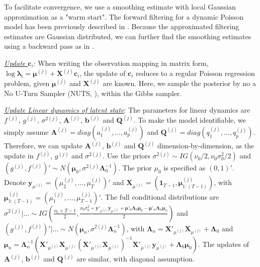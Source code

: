 \documentclass{article}
\begin{document}
	To facilitate convergence, we use a smoothing estimate with local Gaussian approximation as a "warm start". The forward filtering for a dynamic Poisson model has been previously described in \cite{Eden2004}. Because the approximated filtering estimates are Gaussian distributed, we can further find the smoothing estimates using a backward pass as in \cite{RAUCH1965}.
	
	\underline{\textit{Update $\bm{c}_i$}}: 
	When writing the observation mapping in matrix form,
	$\log\bm{\lambda}_i = \bm{\mu}^{(j)}+ \bm{X}^{(j)}\bm{c}_i$, the update of $\bm{c}_i$ reduces to a regular Poisson regression problem, given $\bm{\mu}^{(j)}$ and $\bm{X}^{(j)}$ are known. Here, we sample the posterior by no a No U-Turn Sampler (NUTS, \cite{Hoffman2011}), within the Gibbs sampler.
	
	\underline{\textit{Update Linear dynamics of latent state}}: The parameters for linear dynamics are $f^{(j)}$, $g^{(j)}$, $\sigma^{2(j)}$, $\bm{A}^{(j)}$, $\bm{b}^{(j)}$ and $\bm{Q}^{(j)}$. To make the model identifiable, we simply assume $\bm{A}^{(j)} = diag(a_1^{(j)},\ldots, a_p^{(j)})$ and $\bm{Q}^{(j)} = diag(q_1^{(j)},\ldots, q_p^{(j)})$. Therefore, we can update $\bm{A}^{(j)}$, $\bm{b}^{(j)}$ and $\bm{Q}^{(j)}$ dimension-by-dimension, as the update in $f^{(j)}$, $g^{(j)}$ and $\sigma^{2(j)}$. Use the priors $\sigma^{2(j)} \sim IG\left(\nu_0/2, \nu_0\sigma_0^2/2\right)$ and  $\left( g^{(j)}, f^{(j)}\right)'\sim N(\bm{\mu}_0, \sigma^{2(j)}\bm{\Lambda}_0^{-1})$. The prior $\mu_0$ is specified as $(0,1)'$. Denote $\bm{y}_{\mu^{(j)}} = \left(\mu_2^{(j)}, \ldots, \mu_T^{(j)}\right)'$ and $\bm{X}_{\mu^{(j)}} = \left(\bm{1}_{T-1}, \bm{\mu}_{1:(T-1)}^{(j)}\right)$, with $\bm{\mu}_{1:(T-1)}^{(j)} = \left(\mu_1^{(j)}, \ldots, \mu_{T-1}^{(j)}\right)'$. The full conditional distributions are $\sigma^{2(j)}|\ldots \sim IG\left(\frac{\nu_0 + T-1}{2}, \frac{\nu_0\sigma^2_0 + \bm{y}'_{\mu^{(j)}}\bm{y}_{\mu^{(j)}} + \bm{\mu}'_0\bm{\Lambda}_0\bm{\mu}_0 - \bm{\mu}'_n\bm{\Lambda}_n\bm{\mu}_n }{2}\right)$ and $\left( g^{(j)}, f^{(j)}\right)'|\ldots \sim N(\bm{\mu}_n, \sigma^{2(j)}\bm{\Lambda}_n^{-1})$, with $\bm{\Lambda}_n = \bm{X}'_{\mu^{(j)}}\bm{X}_{\mu^{(j)}} + \bm{\Lambda}_0$ and $\bm{\mu}_n = \bm{\Lambda}_n^{-1}\left(\bm{X}'_{\mu^{(j)}}\bm{X}_{\mu^{(j)}}\left(\bm{X}'_{\mu^{(j)}}\bm{X}_{\mu^{(j)}}\right)^{-1}\bm{X}'_{\mu^{(j)}}\bm{y}_{\mu^{(j)}} + \bm{\Lambda}_0\bm{\mu}_0\right)$. The updates of $\bm{A}^{(j)}$, $\bm{b}^{(j)}$ and $\bm{Q}^{(j)}$ are similar, with diagonal assumption.
	
\end{document}

